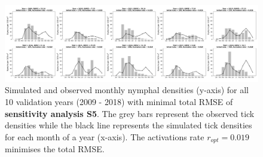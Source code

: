 \documentclass[a4paper, 11pt]{scrartcl}
\begin{document}
\begin{figure}
\centering
\includegraphics[width=\linewidth]{figures/1nymphs_4larvae_with_beech}
\caption{Simulated and observed monthly nymphal densities (y-axis) for all 10 validation years (2009 - 2018) with minimal total RMSE of \textbf{sensitivity analysis S5}. The
grey bars represent the observed tick densities while the black line represents the simulated tick densities for each month of a year (x-axis). The activations rate
$r_{opt}= 0.019$ minimises the total RMSE.}
\label{fig:1nymphs_4larvae_rotated}
\end{figure}
\end{document}
